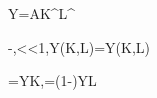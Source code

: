 Y=AK^\alpha L^\beta

-\alpha,<\alpha<1,\qquad Y(\lambda K,\lambda L)=\lambda Y(K,L)

=\alpha\frac YK,\qquad{}=(1-\alpha)\frac YL
